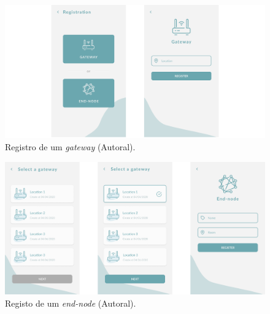 \begin{apendicesenv}
  \begin{figure}[H]
    \centering
    \includegraphics[width=.80\textwidth]{assets/app-screens-4.png} 
    \caption{Registro de um \textit{gateway} (Autoral).}
    \label{fig:app-screens-4} 
  \end{figure}

  \begin{figure}[H]
    \centering
    \includegraphics[width=.80\textwidth]{assets/app-screens-5.png} 
    \caption{Registo de um \textit{end-node} (Autoral).}
    \label{fig:app-screens-5} 
  \end{figure}

\end{apendicesenv}
